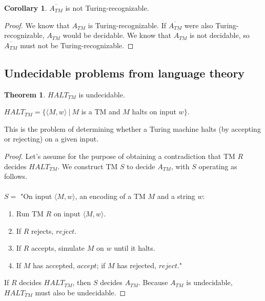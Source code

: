 \documentclass[11pt]{article}
\theoremstyle{definition}
\newtheorem{thm}{Theorem}[section]
\newtheorem{cor}{Corollary}[thm]
\begin{document}
\begin{cor}
    $\overline{A_{TM}}$ is not Turing-recognizable.
\end{cor}
\begin{proof}
    We know that $A_{TM}$ is Turing-recognizable. If $\overline{A_{TM}}$ were also Turing-recognizable, $A_{TM}$ would be decidable. We know that $A_{TM}$ is not decidable, so $\overline{A_{TM}}$ must not be Turing-recognizable.
\end{proof}

\subsection{Undecidable problems from language theory}
\begin{thm}
    $HALT_{TM}$ is undecidable.
    \begin{center}
        $HALT_{TM} = \{\langle M, w\rangle\ |\ M$ is a TM and $M$ halts on input $w\}$.
    \end{center}
    This is the problem of determining whether a Turing machine halts (by accepting or rejecting) on a given input.
\end{thm}
\begin{proof}
    Let's assume for the purpose of obtaining a contradiction that TM $R$ decides $HALT_{TM}$. We construct TM $S$ to decide $A_{TM}$, with $S$ operating as follows.\\\\
    $S = $ "On input $\langle M,w \rangle$, an encoding of a TM $M$ and a string $w$:\\
\begin{enumerate}
    \item Run TM $R$ on input $\langle M,w \rangle$.
    \item If $R$ rejects, $reject$.
    \item If $R$ accepts, simulate $M$ on $w$ until it halts.
    \item If $M$ has accepted, $accept$; if $M$ has rejected, $reject$."
\end{enumerate}
If $R$ decides $HALT_{TM}$, then $S$ decides $A_{TM}$. Because $A_{TM}$ is undecidable, $HALT_{TM}$ must also be undecidable.
\end{proof}
\end{document}
